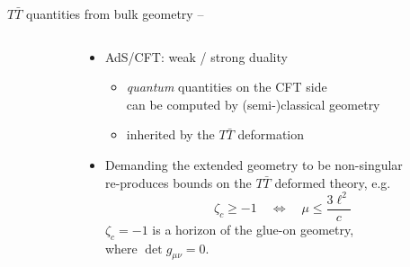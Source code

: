 \documentclass[aspectratio=169,10pt
	,noamsthm
]{beamer}
\newcommand{\TTbar}{\texorpdfstring{\ensuremath{T\bar{T}}}{TTbar}\xspace}
\begin{document}
\begin{frame}{\TTbar quantities from bulk geometry}{%
	\textcite{Apolo:2023vnm} -- 
}
\begin{columns}
\begin{column}{.35\textwidth}
\figGlueon
\end{column}
\begin{column}{.65\textwidth}
\begin{itemize}
\item AdS/CFT: weak / strong duality
	\begin{itemize}
	\item \textit{quantum} quantities on the CFT side\\
		can be computed by (semi-)classical geometry
	\item inherited by the \TTbar deformation
	\end{itemize}
	
\pause
\item Demanding the extended geometry to be non-singular\\
	re-produces bounds on the \TTbar deformed theory, e.g.
	\begin{equation}
		\zeta_c \ge -1 \quad \Leftrightarrow \quad\mu\le \frac{ 3\ell^2 }{c} \label{reality}
	\end{equation}
	$\zeta_c = -1$ is a horizon of the glue-on geometry, \\
	where $\det g_{\mu\nu} = 0$.
	
\end{itemize}
\end{column}
\end{columns}
\end{frame}
\end{document}
